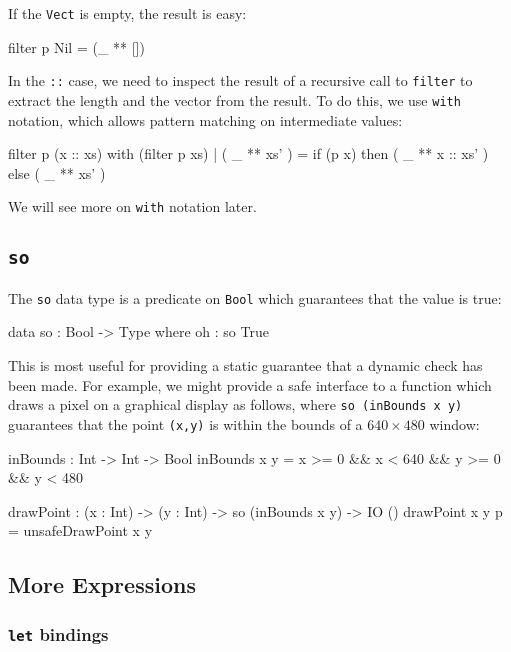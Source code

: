 \noindent
If the \texttt{Vect} is empty, the result is easy:

\begin{code}
filter p Nil = (_ ** [])
\end{code}


\noindent
In the \texttt{::} case, we need to inspect the result of a recursive call to \texttt{filter} to extract the length and the vector from the result.
To do this, we use \texttt{with} notation, which allows pattern matching on intermediate values:

\begin{code}
filter p (x :: xs) with (filter p xs)
  | ( _ ** xs' ) = if (p x) then ( _ ** x :: xs' ) else ( _ ** xs' )
\end{code}

\noindent
We will see more on \texttt{with} notation later.

\subsection{\texttt{so}}

The \texttt{so} data type is a predicate on \texttt{Bool} which guarantees that the value is true:

\begin{code}
data so : Bool -> Type where
    oh : so True
\end{code}

\noindent
This is most useful for providing a static guarantee that a dynamic check has been made.
For example, we might provide a safe interface to a function which draws a pixel on a graphical display as follows, where \texttt{so (inBounds x y)} guarantees that  the point \texttt{(x,y)} is within the bounds of a $640\times480$ window:

\begin{code}
inBounds : Int -> Int -> Bool
inBounds x y = x >= 0 && x < 640 && y >= 0 && y < 480

drawPoint : (x : Int) -> (y : Int) -> so (inBounds x y) -> IO ()
drawPoint x y p = unsafeDrawPoint x y
\end{code}


\subsection{More Expressions}

\subsubsection*{\texttt{let} bindings}

